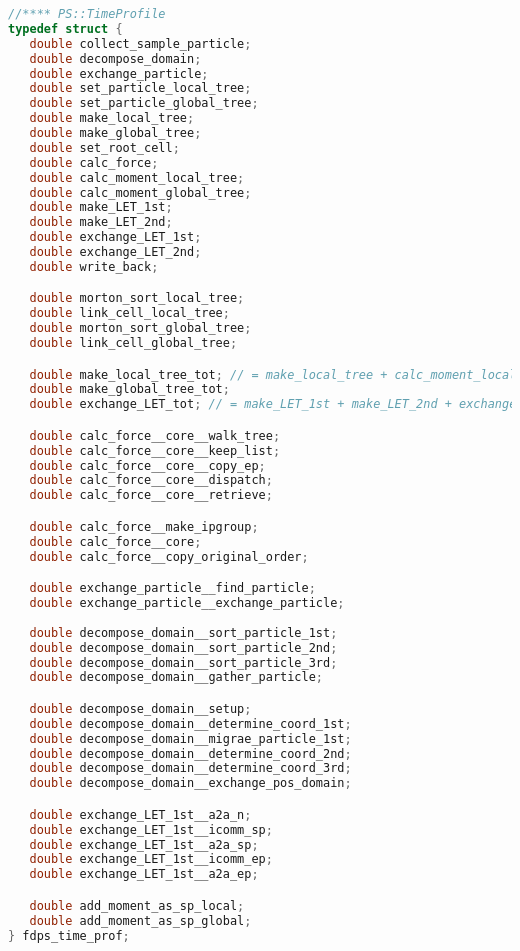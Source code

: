 \begin{lstlisting}[language=C,caption=Time profile types (C),label=listing:time_profile_types_in_C]
//**** PS::TimeProfile
typedef struct {
   double collect_sample_particle;
   double decompose_domain;
   double exchange_particle;
   double set_particle_local_tree;
   double set_particle_global_tree;
   double make_local_tree;
   double make_global_tree;
   double set_root_cell;
   double calc_force;
   double calc_moment_local_tree;
   double calc_moment_global_tree;
   double make_LET_1st;
   double make_LET_2nd;
   double exchange_LET_1st;
   double exchange_LET_2nd;
   double write_back;

   double morton_sort_local_tree;
   double link_cell_local_tree;
   double morton_sort_global_tree;
   double link_cell_global_tree;

   double make_local_tree_tot; // = make_local_tree + calc_moment_local_tree
   double make_global_tree_tot;
   double exchange_LET_tot; // = make_LET_1st + make_LET_2nd + exchange_LET_1st + exchange_LET_2nd

   double calc_force__core__walk_tree;
   double calc_force__core__keep_list;
   double calc_force__core__copy_ep;
   double calc_force__core__dispatch;
   double calc_force__core__retrieve;

   double calc_force__make_ipgroup;
   double calc_force__core;
   double calc_force__copy_original_order;

   double exchange_particle__find_particle;
   double exchange_particle__exchange_particle;
   
   double decompose_domain__sort_particle_1st;
   double decompose_domain__sort_particle_2nd;
   double decompose_domain__sort_particle_3rd;
   double decompose_domain__gather_particle;

   double decompose_domain__setup;
   double decompose_domain__determine_coord_1st;
   double decompose_domain__migrae_particle_1st;
   double decompose_domain__determine_coord_2nd;
   double decompose_domain__determine_coord_3rd;
   double decompose_domain__exchange_pos_domain;

   double exchange_LET_1st__a2a_n;
   double exchange_LET_1st__icomm_sp;
   double exchange_LET_1st__a2a_sp;
   double exchange_LET_1st__icomm_ep;
   double exchange_LET_1st__a2a_ep;

   double add_moment_as_sp_local;
   double add_moment_as_sp_global;
} fdps_time_prof;
\end{lstlisting}

